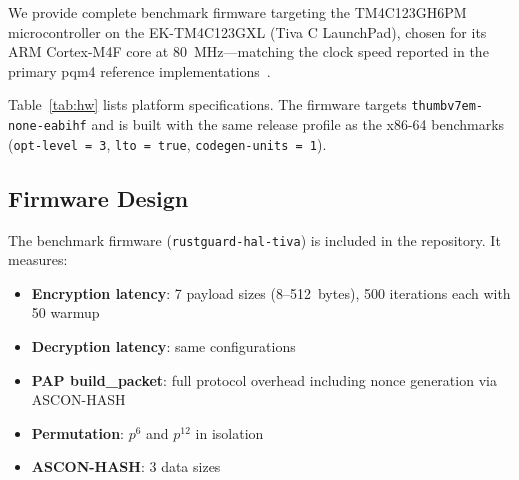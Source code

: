 \documentclass[anonymous]{ndss}
\begin{document}
We provide complete benchmark firmware targeting the TM4C123GH6PM
microcontroller on the EK-TM4C123GXL (Tiva C LaunchPad), chosen for
its ARM Cortex-M4F core at 80~MHz---matching the clock speed reported
in the primary pqm4 reference implementations~\cite{b10}.

\begin{table}[!t]
\centering
\caption{Hardware Evaluation Platform Specifications}
\label{tab:hw}
\renewcommand{\arraystretch}{1.15}
\footnotesize
{}
\end{table}

Table~\ref{tab:hw} lists platform specifications. The firmware targets
\texttt{thumbv7em-none-eabihf} and is built with the same release profile
as the x86-64 benchmarks (\texttt{opt-level\,=\,3}, \texttt{lto\,=\,true},
\texttt{codegen-units\,=\,1}).

\subsection{Firmware Design}

The benchmark firmware (\texttt{rustguard-hal-tiva}) is included in the
repository. It measures:
\begin{itemize}
  \item \textbf{Encryption latency}: 7 payload sizes (8--512~bytes),
        500 iterations each with 50 warmup
  \item \textbf{Decryption latency}: same configurations
  \item \textbf{PAP build\_packet}: full protocol overhead including
        nonce generation via ASCON-HASH
  \item \textbf{Permutation}: $p^6$ and $p^{12}$ in isolation
  \item \textbf{ASCON-HASH}: 3 data sizes
\end{itemize}
\end{document}
